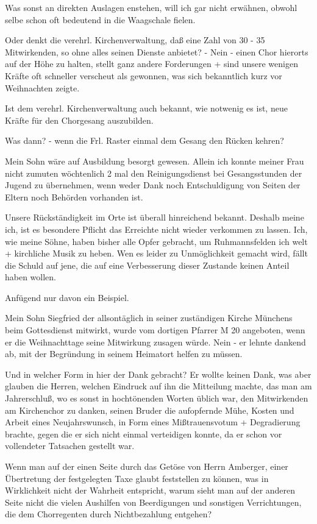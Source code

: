 \documentclass{book}
\begin{document}
Was sonst an direkten Auslagen enstehen, will ich gar nicht erwähnen, obwohl
selbe schon oft bedeutend in die Waagschale fielen.

Oder denkt die verehrl. Kirchenverwaltung, daß eine Zahl von 30 - 35
Mitwirkenden, so ohne alles seinen Dienste anbietet? - Nein - einen Chor
hierorts auf der Höhe zu halten, stellt ganz andere Forderungen + sind unsere
wenigen Kräfte oft schneller verscheut als gewonnen, was sich bekanntlich kurz
vor Weihnachten zeigte.

Ist dem verehrl. Kirchenverwaltung auch bekannt, wie notwenig es ist, neue
Kräfte für den Chorgesang auszubilden.

Was dann? - wenn die Frl. Raster einmal dem Gesang den Rücken kehren?

Mein Sohn wäre auf Ausbildung besorgt gewesen. Allein ich konnte meiner Frau
nicht zumuten wöchtenlich 2 mal den Reinigungsdienst bei Gesangsstunden der
Jugend zu übernehmen, wenn weder Dank noch Entschuldigung von Seiten der Eltern
noch Behörden vorhanden ist.

Unsere Rückständigkeit im Orte ist überall hinreichend bekannt. Deshalb meine
ich, ist es besondere Pflicht das Erreichte nicht wieder verkommen zu lassen.
Ich, wie meine Söhne, haben bisher alle Opfer gebracht, um Ruhmannsfelden ich
welt + kirchliche Musik zu heben. Wen es leider zu Unmöglichkeit gemacht wird,
fällt die Schuld auf jene, die auf eine Verbesserung dieser Zustande keinen
Anteil haben wollen.

Anfügend nur davon ein Beispiel.

Mein Sohn Siegfried der allsontäglich in seiner zuständigen Kirche Münchens beim
Gottesdienst mitwirkt, wurde vom dortigen Pfarrer M 20 angeboten, wenn er die
Weihnachttage seine Mitwirkung zusagen würde. Nein - er lehnte dankend ab, mit
der Begründung in seinem Heimatort helfen zu müssen.

Und in welcher Form in hier der Dank gebracht? Er wollte keinen Dank, was aber
glauben die Herren, welchen Eindruck auf ihn die Mitteilung machte, das man am
Jahrerschluß, wo es sonst in hochtönenden Worten üblich war, den Mitwirkenden am
Kirchenchor zu danken, seinen Bruder die aufopfernde Mühe, Kosten und Arbeit
eines Neujahrswunsch, in Form eines Mißtrauensvotum + Degradierung brachte,
gegen die er sich nicht einmal verteidigen konnte, da er schon vor vollendeter
Tatsachen gestellt war.

Wenn man auf der einen Seite durch das Getöse von Herrn Amberger, einer
Übertretung der festgelegten Taxe glaubt feststellen zu können, was in
Wirklichkeit nicht der Wahrheit entspricht, warum sieht man auf der anderen
Seite nicht die vielen Aushilfen von Beerdigungen und sonstigen Verrichtungen,
die dem Chorregenten durch Nichtbezahlung entgehen?
\end{document}
